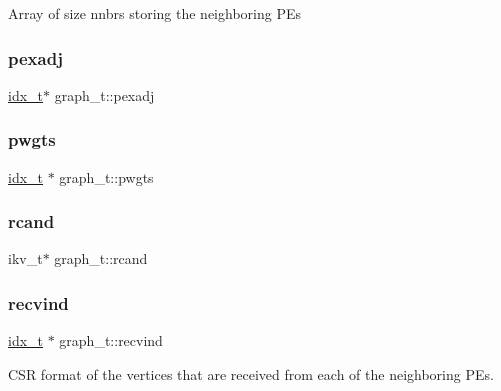 Array of size nnbrs storing the neighboring P\+Es \mbox{\label{structgraph__t_a9197f6a8bb6e42eee08a454a41cb9eb0}} 
\subsubsection{\texorpdfstring{pexadj}{pexadj}}
{\footnotesize\ttfamily \hyperlink{3rd_party_2parmetis-4_80_83_2metis_2include_2metis_8h_aaa5262be3e700770163401acb0150f52}{idx\+\_\+t}$\ast$ graph\+\_\+t\+::pexadj}

\mbox{\label{structgraph__t_aa90c16af72fefbbcb6be11e98c15b95f}} 
\subsubsection{\texorpdfstring{pwgts}{pwgts}}
{\footnotesize\ttfamily \hyperlink{3rd_party_2parmetis-4_80_83_2metis_2include_2metis_8h_aaa5262be3e700770163401acb0150f52}{idx\+\_\+t} $\ast$ graph\+\_\+t\+::pwgts}

\mbox{\label{structgraph__t_a0ddc1a8e97d1d686b4b86060a4048fe5}} 
\subsubsection{\texorpdfstring{rcand}{rcand}}
{\footnotesize\ttfamily ikv\+\_\+t$\ast$ graph\+\_\+t\+::rcand}

\mbox{\label{structgraph__t_a81694becff193fd2e2d1a4cc570f92f7}} 
\subsubsection{\texorpdfstring{recvind}{recvind}}
{\footnotesize\ttfamily \hyperlink{3rd_party_2parmetis-4_80_83_2metis_2include_2metis_8h_aaa5262be3e700770163401acb0150f52}{idx\+\_\+t} $\ast$ graph\+\_\+t\+::recvind}

C\+SR format of the vertices that are received from each of the neighboring P\+Es. \mbox{\label{structgraph__t_a2ffabf365a5f36b6871533a05c02d6b3}} 
